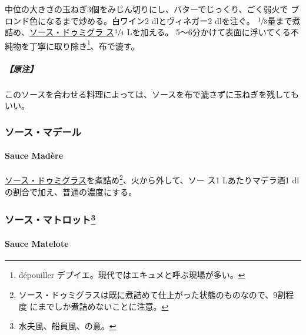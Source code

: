 中位の大きさの玉ねぎ3個をみじん切りにし、バターでじっくり、ごく弱火で
ブロンド色になるまで炒める。白ワイン2 dlとヴィネガー2 dlを注ぐ。
\(\sfrac{1}{3}\)量まで煮詰め、\protect\hyperlink{sauce-demi-glace}{ソース・ドゥミグラ
ス}\(\sfrac{3}{4}\) Lを加える。
5〜6分かけて表面に浮いてくる不純物を丁寧に取り除き\footnote{dépouiller
  デプイエ。現代ではエキュメと呼ぶ現場が多い。}、布で漉す。

\hypertarget{ux539fux6ce8-5}{%
\subparagraph{【原注】}\label{ux539fux6ce8-5}}

このソースを合わせる料理によっては、ソースを布で漉さずに玉ねぎを残してもいい。

\maeaki

\hypertarget{ux30bdux30fcux30b9ux30deux30c7ux30fcux30eb}{%
\subsubsection{ソース・マデール}\label{ux30bdux30fcux30b9ux30deux30c7ux30fcux30eb}}

\hypertarget{sauce-madere}{%
\paragraph{Sauce Madère}\label{sauce-madere}}


\protect\hyperlink{sauce-demi-glace}{ソース・ドゥミグラス}を煮詰め\footnote{ソース・ドゥミグラスは既に煮詰めて仕上がった状態のものなので、9割程度
  にまでしか煮詰めないことに注意。}、火から外して、ソー ス1
Lあたりマデラ酒1 dlの割合で加え、普通の濃度にする。

\maeaki

\hypertarget{ux30bdux30fcux30b9ux30deux30c8ux30edux30c3ux30c854}{%
\subsubsection[ソース・マトロット]{\texorpdfstring{ソース・マトロット\footnote{水夫風、船員風、の意。}}{ソース・マトロット}}\label{ux30bdux30fcux30b9ux30deux30c8ux30edux30c3ux30c854}}

\hypertarget{sauce-matelote}{%
\paragraph{Sauce Matelote}\label{sauce-matelote}}

